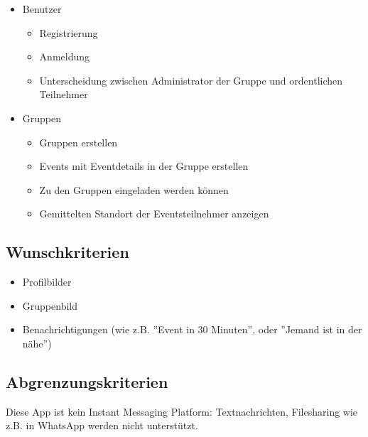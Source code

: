 \documentclass[parskip=full]{scrartcl}
\begin{document}
\begin{itemize}
	\item Benutzer  
	\begin{itemize}
	 	\item Registrierung
	 	\item Anmeldung
	 	\item Unterscheidung zwischen Administrator der Gruppe und ordentlichen Teilnehmer
	\end{itemize} 
	\item Gruppen
		\begin{itemize}
	 		\item Gruppen erstellen
	 		\item Events mit Eventdetails in der Gruppe erstellen 
	 		\item Zu den Gruppen eingeladen werden können
	 		\item Gemittelten Standort der Eventsteilnehmer anzeigen 
		\end{itemize}
\end{itemize}
	
\subsection{Wunschkriterien}
\begin{itemize}
	\item Profilbilder
	\item Gruppenbild
	\item Benachrichtigungen (wie z.B. ''Event in 30 Minuten'', oder ''Jemand ist in der nähe'')
\end{itemize}

\subsection{Abgrenzungskriterien}
Diese App ist kein Instant Messaging Platform: Textnachrichten, Filesharing wie z.B. in WhatsApp werden nicht unterstützt.
\end{document}

